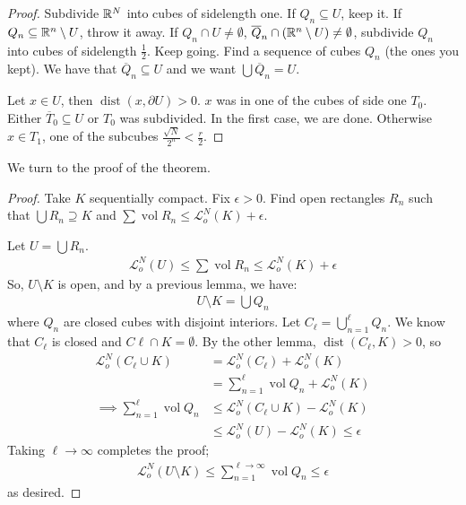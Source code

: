 \documentclass{report}
\DeclareMathOperator{\vol}{vol}
\DeclareMathOperator{\dist}{dist}
\begin{document}
\begin{proof}
    Subdivide $\RR^N$ into cubes of sidelength one. If $Q_n \subseteq U$, keep it. If $Q_n \subseteq \RR^n \setminus U$, throw it away. If $Q_n \cap U \neq \emptyset$, $\overline Q_n \cap   (\RR^n \setminus U) \neq \emptyset$, subdivide $Q_n$ into cubes of sidelength $\frac 12$. Keep going. Find a sequence of cubes $Q_n$ (the ones you kept). We have that $\overline Q_n \subseteq U$ and we want $\bigcup \overline Q_n =  U$. 

    Let $x \in U$, then $\dist(x, \partial U) > 0$. $x$ was in one of the cubes of side one $T_0$. Either $\overline T_0 \subseteq U$ or $T_0$ was subdivided. In the first case, we are done. Otherwise $x \in T_1$, one of the subcubes $\frac{\sqrt N}{2^n} < \frac r2$. 
\end{proof}
\noindent We turn to the proof of the theorem.
\begin{proof}
    Take $K$ sequentially compact. Fix $\epsilon > 0$. Find open rectangles $R_n$ such that $\bigcup R_n \supseteq K$ and $\sum \vol R_n  \leq \mathcal L_o^N(K) + \epsilon$. 

    Let $U = \bigcup R_n$.  \begin{align*}
        \mathcal L_o^N(U) \leq \sum \vol R_n \leq \mathcal L_o^N(K) + \epsilon
    \end{align*}
    So, $U \setminus K$ is open, and by a previous lemma, we have:
    \begin{align*}
        U \setminus K = \bigcup Q_n
    \end{align*}
    where $Q_n$ are closed cubes with disjoint interiors. Let $C_\ell = \bigcup_{n=1}^\ell Q_n$. We know that $C_\ell$ is closed  and $C\ell \cap K = \emptyset$. By the other lemma, $\dist(C_\ell, K) > 0$, so 
    \begin{align*}
        \mathcal L_o^N ( C_\ell \cup K) &= \mathcal L_o^N (C_\ell) + \mathcal L_o^N(K) \\
        &= \sum_{n=1}^\ell \vol Q_n + \mathcal L_o^N (K) \\
        \implies \sum_{n=1}^\ell \vol Q_n &\leq \mathcal L_o^N (C_\ell \cup K) - \mathcal L_o^N(K) \\
        &\leq \mathcal L_o^N(U) - \mathcal L_o^N(K) \leq \epsilon
    \end{align*}
    Taking $\ell \to \infty$ completes the proof; 
    \begin{align*}
        \mathcal L_o^N (U \setminus K) \leq \sum_{n =1}^{\ell \to \infty} \vol Q_n \leq \epsilon
    \end{align*}
    as desired.
\end{proof}
\end{document}
